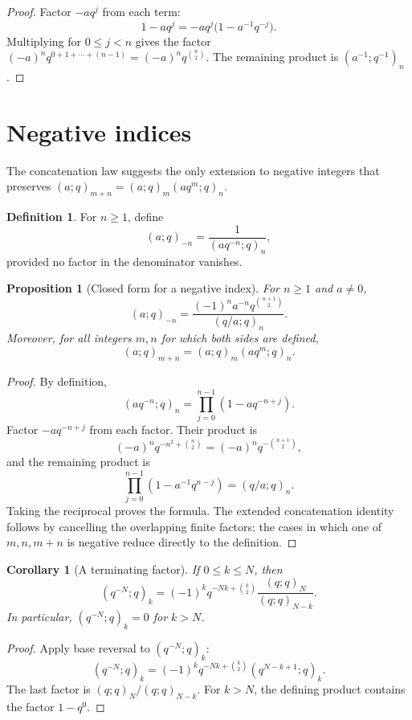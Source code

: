 \documentclass[11pt,oneside,openany]{book}
\newtheorem{proposition}[proposition]{Proposition}
\newtheorem{corollary}[corollary]{Corollary}
\theoremstyle{definition}
\newtheorem{definition}[definition]{Definition}
\theoremstyle{remark}
\begin{document}
\begin{proof}
Factor $-aq^j$ from each term:
\[
 1-aq^j=-aq^j\bigl(1-a^{-1}q^{-j}\bigr).
\]
Multiplying for $0\le j<n$ gives the factor
\(
 (-a)^nq^{0+1+\cdots+(n-1)}=(-a)^nq^{\binom n2}.
\)
The remaining product is $(a^{-1};q^{-1})_n$.
\end{proof}

\section{Negative indices}

The concatenation law suggests the only extension to negative integers that preserves
\((a;q)_{m+n}=(a;q)_m(aq^m;q)_n\).

\begin{definition}
For $n\ge1$, define
\[
 (a;q)_{-n}=\frac{1}{(aq^{-n};q)_n},
\]
provided no factor in the denominator vanishes.
\end{definition}

\begin{proposition}[Closed form for a negative index]\label{prop:negative-index}
For $n\ge1$ and $a\ne0$,
\[
 (a;q)_{-n}
 =\frac{(-1)^n a^{-n}q^{\binom{n+1}{2}}}{(q/a;q)_n}.
\]
Moreover, for all integers $m,n$ for which both sides are defined,
\[
 (a;q)_{m+n}=(a;q)_m(aq^m;q)_n.
\]
\end{proposition}

\begin{proof}
By definition,
\[
 (aq^{-n};q)_n=\prod_{j=0}^{n-1}(1-aq^{-n+j}).
\]
Factor $-a q^{-n+j}$ from each factor.  Their product is
\[
 (-a)^nq^{-n^2+\binom n2}=(-a)^nq^{-\binom{n+1}{2}},
\]
and the remaining product is
\[
 \prod_{j=0}^{n-1}(1-a^{-1}q^{n-j})=(q/a;q)_n.
\]
Taking the reciprocal proves the formula.  The extended concatenation identity follows by cancelling the overlapping finite factors; the cases in which one of $m,n,m+n$ is negative reduce directly to the definition.
\end{proof}

\begin{corollary}[A terminating factor]\label{cor:qminusN}
If $0\le k\le N$, then
\[
 (q^{-N};q)_k=(-1)^kq^{-Nk+\binom k2}
 \frac{(q;q)_N}{(q;q)_{N-k}}.
\]
In particular, $(q^{-N};q)_k=0$ for $k>N$.
\end{corollary}

\begin{proof}
Apply base reversal to $(q^{-N};q)_k$:
\[
 (q^{-N};q)_k=(-1)^kq^{-Nk+\binom k2}(q^{N-k+1};q)_k.
\]
The last factor is $(q;q)_N/(q;q)_{N-k}$.  For $k>N$, the defining product contains the factor $1-q^0$.
\end{proof}
\end{document}
